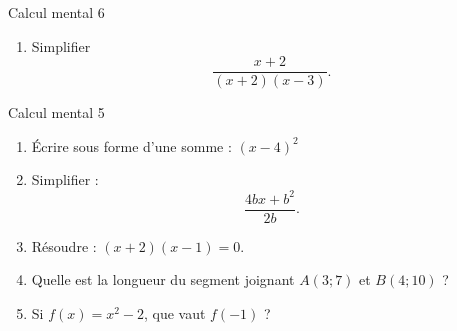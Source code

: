 \documentclass{beamer}
\begin{document}
\begin{frame}{Calcul mental 6}
    \begin{enumerate}
        \item
            \pause
            Simplifier
            \begin{equation}
                \frac{ x+2 }{ (x+2)(x-3) }.
            \end{equation}
    \end{enumerate}
\end{frame}

\begin{frame}{Calcul mental 5}

    \begin{enumerate}
        \item

    \pause
            Écrire sous forme d'une somme : \( (x-4)^2\)

        \item
    \pause
            Simplifier :
            \begin{equation}
                \frac{ 4bx+b^2 }{ 2b }.
            \end{equation}
        \item

    \pause
            Résoudre : \( (x+2)(x-1)=0\).

        \item
    \pause
            Quelle est la longueur du segment joignant \( A(3;7)\) et \( B(4;10)\) ?
        \item
    \pause
            Si \( f(x)=x^2-2\), que vaut \( f(-1)\) ?
            
    \end{enumerate}
\end{frame}

    
\end{document}
